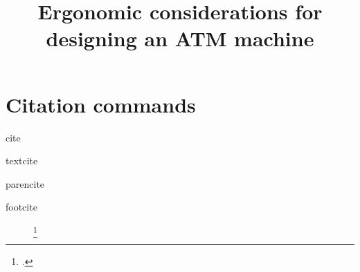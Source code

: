 \documentclass[
  nobib,
  justified,
  english,
  a4paper,
  marginals=raggedright
]{tufte-handout}
\title{\nohyphens{Ergonomic considerations for designing an ATM machine}}
\date{}
\begin{document}
\maketitle

\Blindtext 

\section{Citation commands}

\begin{description}
  \item[cite] 
    \cite{Zimmermann2000a}
  \item[textcite] 
    \textcite{Zimmermann2000a}
  \item[parencite] 
    \parencite{Zimmermann2000a}
  \item[footcite] 
    \footcite{Zimmermann2000a}
\end{description}

\printbibliography

\end{document}
